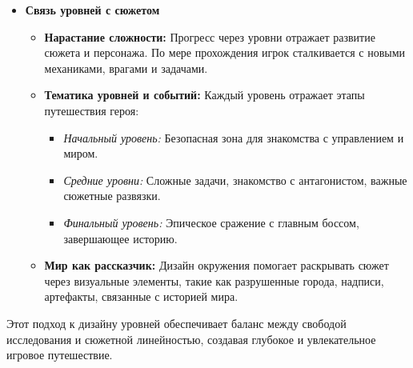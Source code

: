 \documentclass{article}
\begin{document}
\begin{itemize}
\item \textbf{Связь уровней с сюжетом}
\begin{itemize}
    \item \textbf{Нарастание сложности:} Прогресс через уровни отражает развитие сюжета и персонажа. По мере прохождения игрок сталкивается с новыми механиками, врагами и задачами.
    \item \textbf{Тематика уровней и событий:} Каждый уровень отражает этапы путешествия героя:
    \begin{itemize}
        \item \textit{Начальный уровень:} Безопасная зона для знакомства с управлением и миром.
        \item \textit{Средние уровни:} Сложные задачи, знакомство с антагонистом, важные сюжетные развязки.
        \item \textit{Финальный уровень:} Эпическое сражение с главным боссом, завершающее историю.
    \end{itemize}
    \item \textbf{Мир как рассказчик:} Дизайн окружения помогает раскрывать сюжет через визуальные элементы, такие как разрушенные города, надписи, артефакты, связанные с историей мира.
\end{itemize}
\end{itemize}
Этот подход к дизайну уровней обеспечивает баланс между свободой исследования и сюжетной линейностью, создавая глубокое и увлекательное игровое путешествие.
\end{document}
